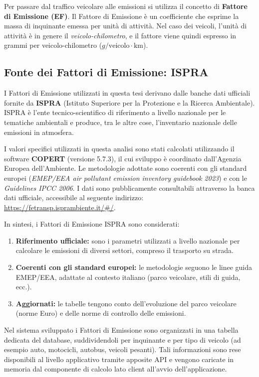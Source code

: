 \documentclass[12pt, oneside]{extbook}
\begin{document}
Per passare dal traffico veicolare alle emissioni si utilizza il concetto di
\textbf{Fattore di Emissione (EF)}. Il Fattore di Emissione è un coefficiente
che esprime la massa di inquinante emessa per unità di attività. Nel caso dei
veicoli, l'unità di attività è in genere il \emph{veicolo-chilometro}, e il
fattore viene quindi espresso in grammi per veicolo-chilometro
($g/\text{veicolo}\cdot\text{km}$).

\subsection{Fonte dei Fattori di Emissione: ISPRA}

I Fattori di Emissione utilizzati in questa tesi derivano dalle banche dati ufficiali fornite da \textbf{ISPRA} (Istituto Superiore per la Protezione e la Ricerca Ambientale). ISPRA è l'ente tecnico-scientifico di riferimento a livello nazionale per le tematiche ambientali e produce, tra le altre cose, l'inventario nazionale delle emissioni in atmosfera. 

I valori specifici utilizzati in questa analisi sono stati calcolati utilizzando il software \textbf{COPERT} (versione 5.7.3), il cui sviluppo è coordinato dall'Agenzia Europea dell'Ambiente. Le metodologie adottate sono coerenti con gli standard europei (\emph{EMEP/EEA air pollutant emission inventory guidebook 2023}) e con le \emph{Guidelines IPCC 2006}. I dati sono pubblicamente consultabili attraverso la banca dati ufficiale, accessibile al seguente indirizzo: \url{https://fetransp.isprambiente.it/#/}.

In sintesi, i Fattori di Emissione ISPRA sono considerati:
\begin{enumerate}
  \item \textbf{Riferimento ufficiale:} sono i parametri utilizzati a livello
        nazionale per calcolare le emissioni di diversi settori, compreso il
        trasporto su strada.
  \item \textbf{Coerenti con gli standard europei:} le metodologie seguono le
        linee guida EMEP/EEA, adattate al contesto italiano (parco veicolare,
        stili di guida, ecc.).
  \item \textbf{Aggiornati:} le tabelle tengono conto dell'evoluzione del parco
        veicolare (norme Euro) e delle norme di controllo delle emissioni.
\end{enumerate}

Nel sistema sviluppato i Fattori di Emissione sono organizzati in una tabella dedicata del database, suddividendoli per inquinante e per tipo di veicolo (ad esempio auto, motocicli, autobus, veicoli pesanti). Tali informazioni sono rese disponibili al livello applicativo tramite apposite API e vengono caricate in memoria dal componente di calcolo lato client all’avvio dell’applicazione.
\end{document}
